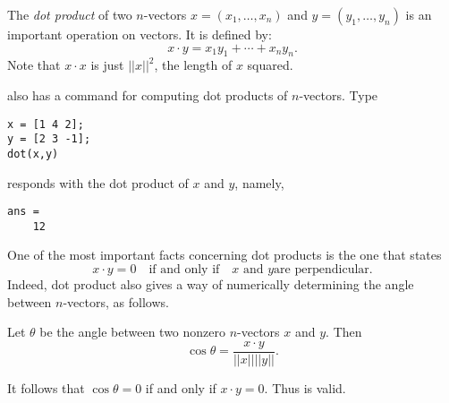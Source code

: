 \documentclass{ximera}
\begin{document}
The {\em dot product\/} of two $n$-vectors
$x=(x_1,\ldots,x_n)$ and $y=(y_1,\ldots,y_n)$ is an important
operation on vectors.  It is defined by:
\begin{equation}  \label{e:dotproduct}
x\cdot y = x_1y_1 + \cdots + x_ny_n.
\end{equation}
Note that $x\cdot x$ is just $||x||^2$, the length of $x$
squared.

\Matlab also has a command for computing dot products of
$n$-vectors.  Type
\begin{verbatim}
x = [1 4 2];
y = [2 3 -1];
dot(x,y)
\end{verbatim}
\Matlab responds with the dot product of $x$ and $y$, namely,
\begin{verbatim}
ans =
    12
\end{verbatim}

One of the most important facts concerning dot products is the
one that states
\begin{equation} \label{dotprod=0}
x\cdot y = 0 \quad \mbox{if and only if} \quad \mbox{$x$ and $y$
are perpendicular}.
\end{equation}  
Indeed, dot product also gives a way of numerically determining
the angle between $n$-vectors, as follows.
\begin{thm} \label{T:dotangle}
Let $\theta$ be the angle between two nonzero $n$-vectors $x$
and $y$.  Then
\begin{equation}  \label{e:dotproductang}
\cos \theta = \frac{x\cdot y}{||x|| ||y||}.
\end{equation}
\end{thm}
It follows that $\cos \theta=0$
if and only if $x\cdot y = 0$.  Thus  is valid.
\end{document}
